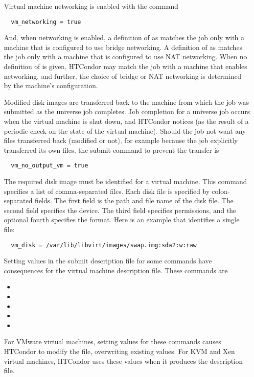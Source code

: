 Virtual machine networking is enabled with the command
\begin{verbatim}
  vm_networking = true
\end{verbatim}
And, when networking is enabled, a definition of
 as 
matches the job only with a machine that is configured to use
bridge networking.
A definition of
 as 
matches the job only with a machine that is configured to use
NAT networking.
When no definition of
 is given,
HTCondor may
match the job with a machine that enables networking,
and further, the choice of bridge or NAT networking
is determined by the machine's configuration.

Modified disk images are transferred back to the machine from which
the job was submitted as the  universe job completes.
Job completion for a  universe job occurs when 
the virtual machine is shut down, and HTCondor notices 
(as the result of a periodic check on the state of the virtual machine).
Should the job not want any files transferred back (modified or not),
for example because the job explicitly transferred its own files,
the submit command to prevent the transfer is
\begin{verbatim}
  vm_no_output_vm = true
\end{verbatim}

The required disk image must be identified for a virtual machine.
This  command specifies a list of comma-separated files.
Each disk file is specified by colon-separated fields.
The first field is the path and file name of the disk file.
The second field specifies the device.
The third field specifies permissions, and the optional 
fourth specifies the format.
Here is an example that identifies a single file:
\footnotesize
\begin{verbatim}
  vm_disk = /var/lib/libvirt/images/swap.img:sda2:w:raw
\end{verbatim}
\normalsize

Setting values in the submit description file for some commands
have consequences for the virtual machine description file.
These commands are
\begin{itemize}
  \item {}
  \item {}
  \item {}
  \item {}
  \item {}
\end{itemize}
For VMware virtual machines,
setting values for these commands causes HTCondor to modify the
 file, overwriting existing values.
For KVM and Xen virtual machines,
HTCondor uses these values when it produces the description file.

